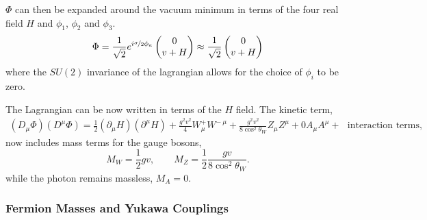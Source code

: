 $\Phi$ can then be expanded around the vacuum minimum in terms of the four real
field $H$ and $\phi_1$, $\phi_2$ and $\phi_3$.
\begin{equation}
\Phi = 
\frac{1}{\sqrt{2}}
e^{i\nicefrac{\sigma}{2}\phi_a}
\left(\begin{matrix}0\\v+H\end{matrix}\right)
\approx 
\frac{1}{\sqrt{2}}
\left(\begin{matrix}0\\v+H\end{matrix}\right)
\end{equation}
where the $SU(2)$ invariance of the lagrangian allows for the choice of $\phi_i$
to be zero\cite{halzen1984quarks}.

The Lagrangian can be now written in terms of the $H$ field. The kinetic
term,\cite{ral}
\begin{align}
\left(D_{\mu}\Phi\right) \left(D^{\mu}\Phi\right) 
= \frac{1}{2} \left(\partial_{\mu}H\right) \left(\partial^{\mu}H\right)
+ \frac{g^{2}v^{2}}{4} W_{\mu}^{+} W^{-~\mu}
+ \frac{g^{2}v^{2}}{8 \cos^{2}\theta_{W}} Z_{\mu} Z^{\mu}
+ 0 A_{\mu} A^{\mu}
+ \text{~ interaction terms},
\end{align}
now includes mass terms for the gauge bosons,
\begin{equation}
M_{W} = \frac{1}{2}gv, \qquad 
M_{Z} = \frac{1}{2}\frac{gv}{8\cos^{2}\theta_{W}} .
\end{equation}
while the photon remains massless, $M_{A}=0$.

\subsubsection{Fermion Masses and Yukawa Couplings}

